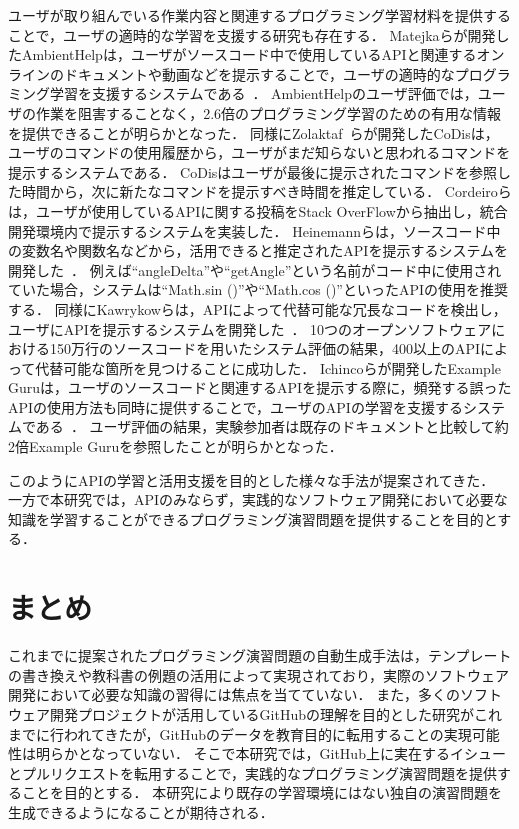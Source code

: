 ユーザが取り組んでいる作業内容と関連するプログラミング学習材料を提供することで，ユーザの適時的な学習を支援する研究も存在する．
Matejkaらが開発したAmbientHelpは，ユーザがソースコード中で使用しているAPIと関連するオンラインのドキュメントや動画などを提示することで，ユーザの適時的なプログラミング学習を支援するシステムである~\cite{Matejka_Ambient_Help}．
AmbientHelpのユーザ評価では，ユーザの作業を阻害することなく，2.6倍のプログラミング学習のための有用な情報を提供できることが明らかとなった．
同様にZolaktaf~\cite{Zolaktaf_Recommending_Commands}らが開発したCoDisは，ユーザのコマンドの使用履歴から，ユーザがまだ知らないと思われるコマンドを提示するシステムである．
CoDisはユーザが最後に提示されたコマンドを参照した時間から，次に新たなコマンドを提示すべき時間を推定している．
Cordeiroらは，ユーザが使用しているAPIに関する投稿をStack OverFlowから抽出し，統合開発環境内で提示するシステムを実装した\cite{Cordeiro_2012_extract_QA_SO}．
Heinemannらは，ソースコード中の変数名や関数名などから，活用できると推定されたAPIを提示するシステムを開発した~\cite{Heinemann_Identifier_Based_API_Recommendation}．
例えば``angleDelta''や``getAngle''という名前がコード中に使用されていた場合，システムは``Math.sin ()''や``Math.cos ()''といったAPIの使用を推奨する．
同様にKawrykowらは，APIによって代替可能な冗長なコードを検出し，ユーザにAPIを提示するシステムを開発した~\cite{Kawrykow_Improving_API_Usage}．
10つのオープンソフトウェアにおける150万行のソースコードを用いたシステム評価の結果，400以上のAPIによって代替可能な箇所を見つけることに成功した．
Ichincoらが開発したExample Guruは，ユーザのソースコードと関連するAPIを提示する際に，頻発する誤ったAPIの使用方法も同時に提供することで，ユーザのAPIの学習を支援するシステムである~\cite{Ichinco_Suggesting_API_Usage}．
ユーザ評価の結果，実験参加者は既存のドキュメントと比較して約2倍Example Guruを参照したことが明らかとなった．

このようにAPIの学習と活用支援を目的とした様々な手法が提案されてきた．
一方で本研究では，APIのみならず，実践的なソフトウェア開発において必要な知識を学習することができるプログラミング演習問題を提供することを目的とする．


\section{まとめ}
これまでに提案されたプログラミング演習問題の自動生成手法は，テンプレートの書き換えや教科書の例題の活用によって実現されており，実際のソフトウェア開発において必要な知識の習得には焦点を当てていない．
また，多くのソフトウェア開発プロジェクトが活用しているGitHubの理解を目的とした研究がこれまでに行われてきたが，GitHubのデータを教育目的に転用することの実現可能性は明らかとなっていない．
そこで本研究では，GitHub上に実在するイシューとプルリクエストを転用することで，実践的なプログラミング演習問題を提供することを目的とする．
本研究により既存の学習環境にはない独自の演習問題を生成できるようになることが期待される．
